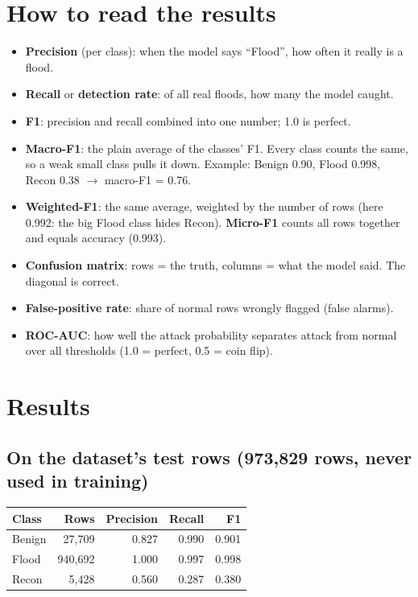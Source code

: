 \documentclass[11pt,a4paper]{article}
\newcommand{\tablestart}{\Needspace{8\baselineskip}}
\begin{document}
\section{How to read the results}

\begin{itemize}
  \item \textbf{Precision} (per class): when the model says ``Flood'', how often it really is a flood.
  \item \textbf{Recall} or \textbf{detection rate}: of all real floods, how many the model caught.
  \item \textbf{F1}: precision and recall combined into one number; 1.0 is perfect.
  \item \textbf{Macro-F1}: the plain average of the classes' F1. Every class counts the same, so a weak small class
        pulls it down. Example: Benign 0.90, Flood 0.998, Recon 0.38 $\rightarrow$ macro-F1 = 0.76.
  \item \textbf{Weighted-F1}: the same average, weighted by the number of rows (here 0.992: the big Flood class hides
        Recon). \textbf{Micro-F1} counts all rows together and equals accuracy (0.993).
  \item \textbf{Confusion matrix}: rows = the truth, columns = what the model said. The diagonal is correct.
  \item \textbf{False-positive rate}: share of normal rows wrongly flagged (false alarms).
  \item \textbf{ROC-AUC}: how well the attack probability separates attack from normal over all thresholds
        (1.0 = perfect, 0.5 = coin flip).
\end{itemize}

\section{Results}\label{sec:results}

\subsection{On the dataset's test rows (973,829 rows, never used in training)}

\tablestart
\begin{center}
\begin{tabular}{lrrrr}
\toprule
Class & Rows & Precision & Recall & F1 \\
\midrule
Benign & 27,709 & 0.827 & 0.990 & 0.901 \\
Flood & 940,692 & 1.000 & 0.997 & 0.998 \\
Recon & 5,428 & 0.560 & 0.287 & 0.380 \\
\bottomrule
\end{tabular}
\end{center}
\end{document}

